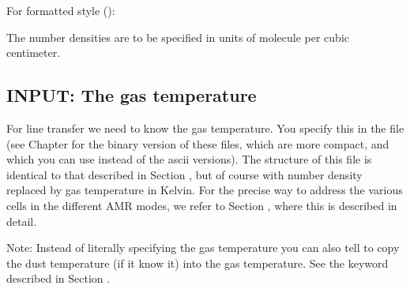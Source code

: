 \documentclass[letterpaper,10pt,english]{sphinxmanual}
\begin{document}
For formatted style ():

\begin{sphinxVerbatim}[commandchars=\\\{\}]
                                      
\PYG{p}{[}\PYG{p}{]}
\PYG{p}{[}\PYG{p}{]}
\end{sphinxVerbatim}

The number densities are to be specified in units of molecule per cubic
centimeter.


\subsection{INPUT: The gas temperature}
\label{\detokenize{lineradtrans:input-the-gas-temperature}}\label{\detokenize{lineradtrans:sec-gas-temperature}}
For line transfer we need to know the gas temperature. You specify this in the
file  (see Chapter {\hyperref[\detokenize{binaryio:chap-binary-io}]{}} for the binary
version of these files, which are more compact, and which you can use instead of
the ascii versions). The structure of this file is identical to that described
in Section {\hyperref[\detokenize{lineradtrans:sec-mol-numdensity}]{}}, but of course with number density replaced
by gas temperature in Kelvin. For the precise way to address the various cells
in the different AMR modes, we refer to Section {\hyperref[\detokenize{inputoutputfiles:sec-dustdens}]{}}, where this
is described in detail.

Note: Instead of literally specifying the gas temperature you can also tell
 to copy the dust temperature (if it know it) into the gas
temperature. See the keyword  described in Section
{\hyperref[\detokenize{lineradtrans:sec-line-radmc-inp}]{}}.
\end{document}
